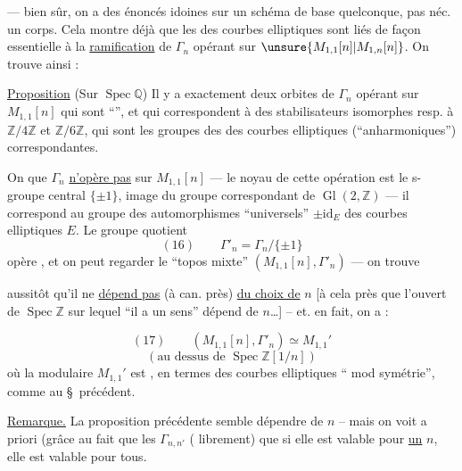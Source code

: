 
--- bien sûr, on a des énoncés idoines sur un schéma de base quelconque, pas néc. un corps. Cela montre déjà que les  des courbes elliptiques sont liés de façon essentielle à la \uline{ramification} de $\Gamma_n$ opérant sur $\unsure{M_{1,1}[n]|M_{1,n}[n]}$. On trouve ainsi :

\uline{Proposition} (Sur $\operatorname{Spec}\mathbb Q$) Il y a exactement deux orbites de $\Gamma_n$ opérant sur $M_{1,1}[n]$ qui sont ``'', et qui correspondent à des stabilisateurs isomorphes resp. à $\mathbb Z/4\mathbb Z$ et $\mathbb Z/6\mathbb Z$, qui sont les groupes des  des courbes elliptiques (``anharmoniques'') correspondantes.


On  que $\Gamma_n$ \uline{n'opère pas}  sur $M_{1,1}[n]$ --- le noyau de cette opération est le s-groupe central $\{\pm1\}$, image du groupe correspondant de $\operatorname{Gl}(2,\mathbb Z)$ --- il correspond au groupe des automorphismes ``universels'' $\pm\mathrm{id}_E$ des courbes elliptiques $E$. Le groupe quotient
\[
(16)\qquad \Gamma'_n=\Gamma_n/\{\pm1\}
\]
 opère , et on peut regarder le ``topos mixte'' $(M_{1,1}[n],\Gamma'_n)$ --- on trouve

aussitôt qu'il ne \uline{dépend pas} (à  can. près) \uline{du choix de} $n$ [à cela près que l'ouvert de $\operatorname{Spec}\mathbb Z$ sur lequel ``il a un sens'' dépend de $n$\dots] -- et. en fait, on a :


\[
(17)\qquad (M_{1,1}[n],\Gamma'_n)\simeq M_{1,1}'
\]
\[
(\text{au dessus de }\operatorname{Spec}\mathbb Z[1/n])
\]
où la   modulaire $M_{1,1}'$ est , en termes des courbes elliptiques `` mod symétrie'', comme au \S\ précédent.

\uline{Remarque.} La proposition précédente semble dépendre de $n$ -- mais on voit a priori  (grâce au fait que les $\Gamma_{n,n'}$  ( librement) que si elle est valable pour \uline{un} $n$, elle est valable pour tous.

